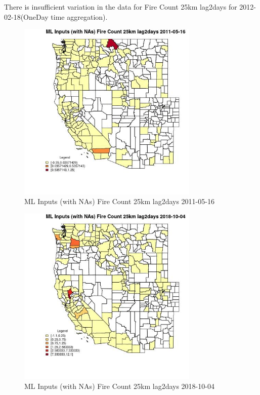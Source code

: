 There is insufficient variation in the data for Fire Count 25km lag2days for 2012-02-18(OneDay time aggregation). 
 

\begin{figure} 
\centering  
\includegraphics[width=0.77\textwidth]{Code_Outputs/Report_ML_input_PM25_Step4_part_f_de_duplicated_aves_prioritize_24hr_obswNAs_CountyFire_Count_25km_lag2daysMean2011-05-16.jpg} 
\caption{\label{fig:Report_ML_input_PM25_Step4_part_f_de_duplicated_aves_prioritize_24hr_obswNAsCountyFire_Count_25km_lag2daysMean2011-05-16}ML Inputs (with NAs) Fire Count 25km lag2days 2011-05-16} 
\end{figure} 
 

\begin{figure} 
\centering  
\includegraphics[width=0.77\textwidth]{Code_Outputs/Report_ML_input_PM25_Step4_part_f_de_duplicated_aves_prioritize_24hr_obswNAs_CountyFire_Count_25km_lag2daysMean2018-10-04.jpg} 
\caption{\label{fig:Report_ML_input_PM25_Step4_part_f_de_duplicated_aves_prioritize_24hr_obswNAsCountyFire_Count_25km_lag2daysMean2018-10-04}ML Inputs (with NAs) Fire Count 25km lag2days 2018-10-04} 
\end{figure} 
 

